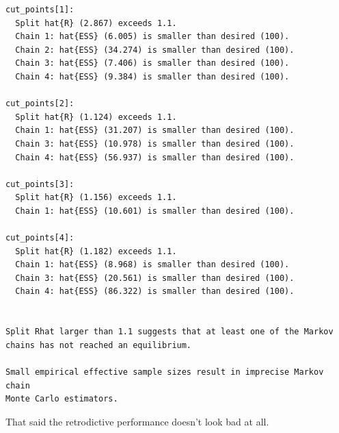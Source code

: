 \documentclass[
  letterpaper,
  DIV=11,
  numbers=noendperiod]{scrartcl}
\newenvironment{Shaded}{\begin{snugshade}}{\end{snugshade}}
\newcommand{\AttributeTok}[1]{\textcolor[rgb]{0.40,0.45,0.13}{#1}}
\newcommand{\ConstantTok}[1]{\textcolor[rgb]{0.56,0.35,0.01}{#1}}
\newcommand{\FunctionTok}[1]{\textcolor[rgb]{0.28,0.35,0.67}{#1}}
\newcommand{\NormalTok}[1]{\textcolor[rgb]{0.00,0.23,0.31}{#1}}
\newcommand{\OtherTok}[1]{\textcolor[rgb]{0.00,0.23,0.31}{#1}}
\newcommand{\SpecialCharTok}[1]{\textcolor[rgb]{0.37,0.37,0.37}{#1}}
\newcommand{\StringTok}[1]{\textcolor[rgb]{0.13,0.47,0.30}{#1}}
\begin{document}
\begin{Shaded}
\end{Shaded}

\begin{verbatim}
cut_points[1]:
  Split hat{R} (2.867) exceeds 1.1.
  Chain 1: hat{ESS} (6.005) is smaller than desired (100).
  Chain 2: hat{ESS} (34.274) is smaller than desired (100).
  Chain 3: hat{ESS} (7.406) is smaller than desired (100).
  Chain 4: hat{ESS} (9.384) is smaller than desired (100).

cut_points[2]:
  Split hat{R} (1.124) exceeds 1.1.
  Chain 1: hat{ESS} (31.207) is smaller than desired (100).
  Chain 3: hat{ESS} (10.978) is smaller than desired (100).
  Chain 4: hat{ESS} (56.937) is smaller than desired (100).

cut_points[3]:
  Split hat{R} (1.156) exceeds 1.1.
  Chain 1: hat{ESS} (10.601) is smaller than desired (100).

cut_points[4]:
  Split hat{R} (1.182) exceeds 1.1.
  Chain 1: hat{ESS} (8.968) is smaller than desired (100).
  Chain 3: hat{ESS} (20.561) is smaller than desired (100).
  Chain 4: hat{ESS} (86.322) is smaller than desired (100).


Split Rhat larger than 1.1 suggests that at least one of the Markov
chains has not reached an equilibrium.

Small empirical effective sample sizes result in imprecise Markov chain
Monte Carlo estimators.
\end{verbatim}

That said the retrodictive performance doesn't look bad at all.
\end{document}
